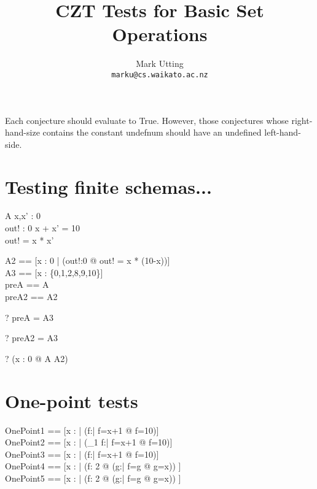 \documentclass{article}
\title{CZT Tests for Basic Set Operations}
\author{Mark Utting \\ \texttt{marku@cs.waikato.ac.nz}}
\begin{document}
\maketitle

Each conjecture should evaluate to True.
However, those conjectures whose right-hand-size contains
the constant undefnum should have an undefined left-hand-side.


\section{Testing finite schemas...}

\begin{schema}{A}
  x,x' : 0  \\
  out! : 0 
\where
  x + x' = 10 \\
  out! = x * x'
\end{schema}

\begin{zed}
  A2 == [x : 0  | (\exists out!:0  @ out! = x * (10-x))]
\\
  A3 == [x : \{0,1,2,8,9,10\}]
\\
  preA == \pre A
\\
  preA2 == \pre A2
\end{zed}

\begin{zed} \vdash? preA = A3 \end{zed}
\begin{zed} \vdash? preA2 = A3 \end{zed}

\begin{zed} \vdash? (\forall x : 0  @ \pre A \iff A2) \end{zed}

\section{One-point tests}
\begin{zed}
  OnePoint1 == [x : \nat | (\exists   f:\nat | f=x+1 @ f=10)] \\
  OnePoint2 == [x : \nat | (\exists_1 f:\nat | f=x+1 @ f=10)] \\
  OnePoint3 == [x : \nat | (\forall   f:\nat | f=x+1 @ f=10)] \\
  OnePoint4 == [x : \nat | (\forall f: 2  @
                               (\exists g:\nat | f=g @ g=x)) ] \\
  OnePoint5 == [x : \nat | (\exists f: 2  @
                               (\forall g:\nat | f=g @ g=x)) ]
\end{zed}
\end{document}
